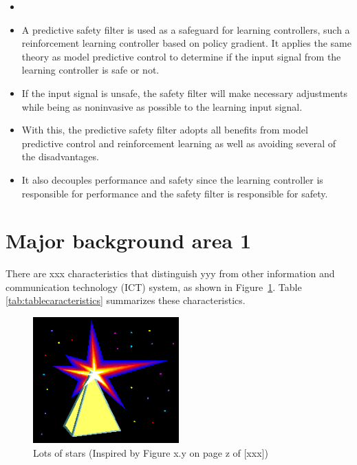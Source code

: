 \documentclass[english]{kththesis}
\begin{document}
\begin{itemize}
    \item \cite{wabersich2021safe}
    \item A predictive safety filter is used as a safeguard for learning controllers, such a reinforcement learning controller based on policy gradient. It applies the same theory as model predictive control to determine if the input signal from the learning controller is safe or not.
    \item If the input signal is unsafe, the safety filter will make necessary adjustments while being as noninvasive as possible to the learning input signal.
    \item With this, the predictive safety filter adopts all benefits from model predictive control and reinforcement learning as well as avoiding several of the disadvantages.
    \item It also decouples performance and safety since the learning controller is responsible for performance and the safety filter is responsible for safety.
\end{itemize}


\section{Major background area 1}
There are xxx characteristics that distinguish yyy from other information and communication technology (ICT) system, as shown in Figure~\ref{fig:lotsofstars}. Table \ref{tab:tablecaracteristics} summarizes these characteristics.

 
\begin{figure}[!ht]
  \begin{center}
    \includegraphics[width=0.5\textwidth]{lots_of_stars.png}
  \end{center}
  \caption{Lots of stars  (Inspired by Figure x.y on page z of [xxx])}
  \label{fig:lotsofstars}
\end{figure}
\end{document}
